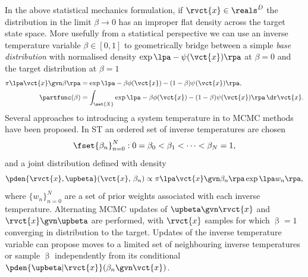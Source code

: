In the above statistical mechanics formulation, if $\rvct{x} \in \reals^D$ the distribution in the limit $\beta \to 0$ has an improper flat density across the target state space. More usefully from a statistical perspective we can use an inverse temperature variable $\beta \in [0, 1]$ to geometrically bridge between a simple \emph{base distribution} with normalised density $\exp\lpa-\psi(\vct{x})\rpa$ at $\beta=0$ and the target distribution at $\beta=1$
\begin{align}
  \pi\lpa\vct{x} \gvn \beta \rpa &=
  \exp\lpa -\beta\phi(\vct{x}) - (1-\beta)\psi(\vct{x}) \rpa, \label{eq:geometric-bridge} \\
  \partfunc(\beta) &= 
  \int_{\set{X}} 
    \exp\lpa -\beta\phi(\vct{x}) - (1-\beta)\psi(\vct{x}) \rpa
  \,\dr\vct{x}. \label{eq:partition-function}
\end{align}
Several approaches to introducing a system temperature in to \ac{MCMC} methods have been proposed. In \ac{ST} \citep{marinari1992simulated} an ordered set of inverse temperatures are chosen
\begin{equation}\label{eq:finite-inv-temp-schedule}
  \fset{\beta_n}_{n=0}^N : 0 = \beta_0 < \beta_1 < \dots < \beta_N = 1,
\end{equation}
and a joint distribution defined with density
\begin{equation}\label{eq:simulated-tempering-joint}
  \pden{\rvct{x},\upbeta}(\vct{x},\,\beta_n) \propto
  \pi\lpa\vct{x} \gvn \beta_n \rpa \exp\lpa w_n\rpa,
\end{equation}
where $\lbrace w_n\rbrace_{n=0}^N$ are a set of prior weights associated with each inverse temperature. Alternating \ac{MCMC} updates of $\upbeta\gvn\rvct{x}$ and $\rvct{x}\gvn\upbeta$ are performed, with $\rvct{x}$ samples for which $\upbeta=1$ converging in distribution to the target. Updates of the inverse temperature variable can propose moves to a limited set of neighbouring inverse temperatures or sample $\upbeta$ independently from its conditional $\pden{\upbeta|\rvct{x}}(\beta_n\gvn\vct{x})$.

